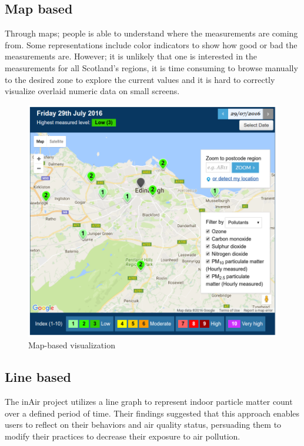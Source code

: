 \subsection{Map based}
Through maps; people is able to understand where the measurements are coming from. Some representations include color indicators to show how good or bad the measurements are. However; it is unlikely that one is interested in the measurements for all Scotland's regions, it is time consuming to browse manually to the desired zone to explore the current values and it is hard to correctly visualize overlaid numeric data on small screens.

\begin{figure}[H]
\begin{adjustbox}{width=1\textwidth,center=\textwidth}
  \centering
  \includegraphics[scale=.30]{images/map_visualization.png}
\end{adjustbox}
  \caption[Map-based visualization]{Map-based visualization \cite{Scottishairquality.co.uk2016}}
  \label{fig:web_based_desktop_visualization}
\end{figure}


\subsection{Line based}
The inAir project \cite{Kim2013} utilizes a line graph to represent indoor particle matter count over a defined period of time. Their findings suggested that this approach enables users to reflect on their behaviors and air quality status, persuading them to modify their practices to decrease their exposure to air pollution.

